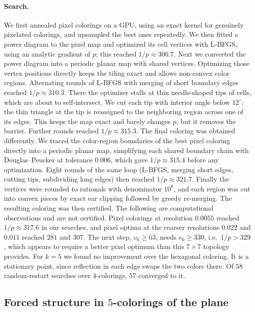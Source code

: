 \documentclass[11pt]{article}
\theoremstyle{definition}
\theoremstyle{remark}
\begin{document}
\paragraph{Search.}
We first annealed pixel colorings on a GPU, using an exact kernel for
genuinely pixelated colorings, and upsampled the best ones repeatedly.
We then fitted a power diagram to the pixel map and optimized its cell
vertices with L-BFGS, using an analytic gradient of $p$; this reached
$1/p\approx300.7$.  Next we converted the power diagram into a periodic
planar map with shared vertices.  Optimizing those vertex positions
directly keeps the tiling exact and allows non-convex color regions.
Alternating rounds of L-BFGS with merging of short boundary edges
reached $1/p\approx310.3$.  There the optimizer stalls at thin
needle-shaped tips of cells, which are about to self-intersect.  We cut
each tip with interior angle below $12^\circ$: the thin triangle at the
tip is reassigned to the neighboring region across one of its edges.
This keeps the map exact and barely changes $p$, but it removes the
barrier.  Further rounds reached $1/p\approx315.3$.  The final
coloring was obtained differently.  We traced the color-region
boundaries of the best pixel coloring directly into a periodic planar
map, simplifying each shared boundary chain with Douglas--Peucker at
tolerance $0.006$, which gave $1/p\approx315.4$ before any optimization.
Eight rounds of the same loop (L-BFGS, merging short edges, cutting
tips, subdividing long edges) then reached $1/p\approx321.7$.  Finally the vertices were rounded to
rationals with denominator $10^8$, and each region was cut
into convex pieces by exact ear clipping followed by greedy re-merging.
The resulting coloring was then certified.  The following are
computational observations and are not certified.  Pixel colorings at
resolution $0.0055$ reached $1/p\approx317.6$ in our searches, and
pixel optima at the coarser resolutions $0.022$ and $0.011$ reached $281$
and $307$.  The next step, $v_6\ge63$, needs $e_6\ge330$,
i.e.\ $1/p>329$, which appears to require a better pixel optimum than
this $7\times7$ topology provides.  For $k=5$ we found
no improvement over the hexagonal coloring.  It is a stationary point,
since reflection in each edge swaps the two colors there.  Of $58$
random-restart searches over $4$-colorings, $57$ converged to it.

\subsection{Forced structure in $5$-colorings of the plane}\label{sec:forced}
\end{document}
